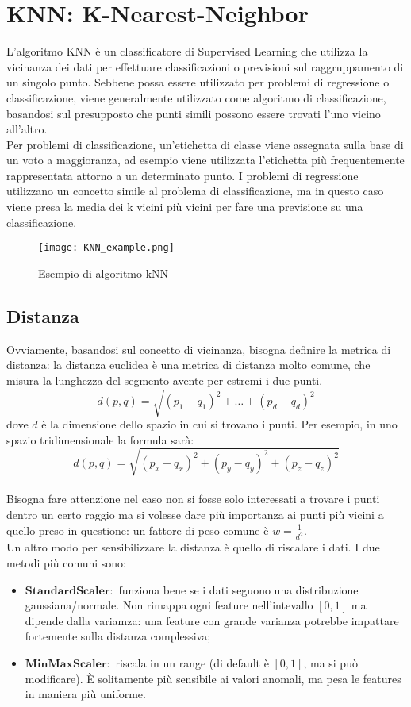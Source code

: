 \section{KNN: K-Nearest-Neighbor}
	L'algoritmo KNN è un classificatore di Supervised Learning che utilizza la vicinanza dei dati per effettuare classificazioni o previsioni sul raggruppamento di un singolo punto.
	Sebbene possa essere utilizzato per problemi di regressione o classificazione, viene generalmente utilizzato come algoritmo di classificazione, basandosi sul presupposto che punti simili possono essere trovati l'uno vicino all'altro.
	\\[1\baselineskip]
	Per problemi di classificazione, un'etichetta di classe viene assegnata sulla base di un voto a maggioranza, ad esempio viene utilizzata l'etichetta più frequentemente rappresentata attorno a un determinato punto.
	I problemi di regressione utilizzano un concetto simile al problema di classificazione, ma in questo caso viene presa la media dei k vicini più vicini per fare una previsione su una classificazione.

	\begin{figure}[h]
		\caption{Esempio di algoritmo kNN}
		\centering
		\texttt{[image: KNN\_example.png]}
	\end{figure}

		\subsection{Distanza}
			Ovviamente, basandosi sul concetto di vicinanza, bisogna definire la metrica di distanza: la distanza euclidea è una metrica di distanza molto comune, che misura la lunghezza del segmento avente per estremi i due punti.
			$$d(p, q) = \sqrt{(p_{1} - q_{1})^{2} + \dots + (p_{d} - q_{d})^{2}}$$ dove $d$ è la dimensione dello spazio in cui si trovano i punti.
			Per esempio, in uno spazio tridimensionale la formula sarà: $$d(p, q) = \sqrt{(p_{x} - q_{x})^{2} + (p_{y} - q_{y})^{2} + (p_{z} - q_{z})^{2}}$$
			\\[1\baselineskip]
			Bisogna fare attenzione nel caso non si fosse solo interessati a trovare i punti dentro un certo raggio ma si volesse dare più importanza ai punti più vicini a quello preso in questione: un fattore di peso comune è $w = \frac{1}{d^{2}}$.
			\\[1\baselineskip]
			Un altro modo per sensibilizzare la distanza è quello di riscalare i dati. I due metodi più comuni sono:
			\begin{itemize}
				\item $\textbf{StandardScaler}:$ funziona bene se i dati seguono una distribuzione gaussiana/normale. Non rimappa ogni feature nell'intevallo $[0, 1]$ ma dipende dalla variamza: una feature con grande varianza potrebbe impattare fortemente sulla distanza complessiva;
				\item $\textbf{MinMaxScaler}:$ riscala in un range (di default è $[0, 1]$, ma si può modificare). È solitamente più sensibile ai valori anomali, ma pesa le features in maniera più uniforme.
			\end{itemize}

